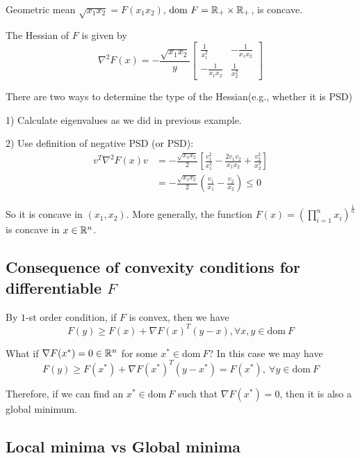 \begin{example}
	Geometric mean $\sqrt{x_1x_2} = F(x_1x_2)$, $\text{dom}\ F = \mathbb{R}_+ \times \mathbb{R}_+$, is concave. 
	
	The Hessian of $F$ is given by
	\begin{equation*}
	\nabla^2F(x) = -\frac{\sqrt{x_1x_2}}{y}\begin{bmatrix}
	\frac{1}{x^2_1} & -\frac{1}{x_1x_2}\\
	-\frac{1}{x_1x_2} & \frac{1}{x^2_2}
	\end{bmatrix}
	\end{equation*}
	
	There are two ways to determine the type of the Hessian(e.g., whether it is PSD)
	
	1) Calculate eigenvalues as we did in previous example.
	
	2) Use definition of negative PSD (or PSD):
	\begin{align*}
	v^T\nabla^2F(x)v &= -\frac{\sqrt{x_1x_2}}{2}[\frac{v_1^2}{x_1^2} - \frac{2v_1v_2}{x_1x_2} + \frac{v_2^2}{x^2_2}]\\
	&= -\frac{\sqrt{x_1x_2}}{2}(\frac{v_1}{x_1} -\frac{v_2}{x_2}) \leq 0
	\end{align*}
	
	So it is concave in $(x_1, x_2)$. More generally, the function $F(x) = (\prod^n_{i=1}x_i)^{\frac{1}{n}}$ is concave in $x\in \mathbb{R}^n$.
\end{example}

\subsection{Consequence of convexity conditions for differentiable $F$}

\quad By $1$-st order condition, if $F$ is convex, then we have
$$F(y)\geq F(x) + \nabla F(x)^T(y-x), \forall x,y\in \text{dom}\ F$$

What if $\nabla F(x^*) = 0 \in \mathbb{R}^n$ for some $x^*\in \text{dom}\ F$? In this case we may have
$$F(y)\geq F(x^*) + \nabla F(x^*)^T(y-x^*)=F(x^*),\ \forall y\in \text{dom}\ F$$

Therefore, if we can find an $x^*\in \text{dom}\ F$ such that $\nabla F(x^*) = 0$, then it is also a global minimum.





\subsection{Local minima vs Global minima}

